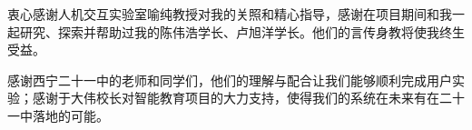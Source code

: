 
\begin{acknowledgements}
  衷心感谢人机交互实验室喻纯教授对我的关照和精心指导，感谢在项目期间和我一起研究、探索并帮助过我的陈伟浩学长、卢旭洋学长。他们的言传身教将使我终生受益。

  感谢西宁二十一中的老师和同学们，他们的理解与配合让我们能够顺利完成用户实验；感谢于大伟校长对智能教育项目的大力支持，使得我们的系统在未来有在二十一中落地的可能。

\end{acknowledgements}
